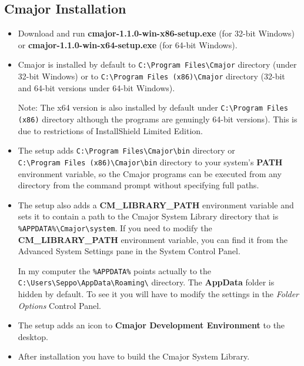 \documentclass[oneside, a4paper, 11pt]{article}
\begin{document}
\subsection{Cmajor Installation}

\begin{itemize}

\item
Download and run \textbf{cmajor-1.1.0-win-x86-setup.exe} (for 32-bit Windows) or
\textbf{cmajor-1.1.0-win-x64-setup.exe} (for 64-bit Windows).

\item
Cmajor is installed by default to \verb|C:\Program Files\Cmajor| directory (under 32-bit Windows) or
to \verb|C:\Program Files (x86)\Cmajor| directory (32-bit and 64-bit versions under 64-bit Windows).

Note: The x64 version is also installed by default under
\verb|C:\Program Files (x86)| directory although the programs are genuingly 64-bit versions).
This is due to restrictions of InstallShield Limited Edition.

\item
The setup adds \verb|C:\Program Files\Cmajor\bin| directory or \\
\verb|C:\Program Files (x86)\Cmajor\bin| directory
to your system's \textbf{PATH} environment variable, so the Cmajor programs can be executed from any
directory from the command prompt without specifying full paths.

\item
The setup also adds a \textbf{CM\_LIBRARY\_PATH} environment variable and
sets it to contain a path to the Cmajor System Library directory
that is \verb|%APPDATA%\Cmajor\system|. If you need to modify the
\textbf{CM\_LIBRARY\_PATH} environment variable, you can find it from the Advanced System Settings pane in the System Control Panel.

In my computer the \verb|%APPDATA%| points actually to the
\verb|C:\Users\Seppo\AppData\Roaming\| directory. The \textbf{AppData} folder
is hidden by default. To see it you will have to modify the settings in
the \emph{Folder Options} Control Panel.

\item
The setup adds an icon to \textbf{Cmajor Development Environment} to the desktop.

\item
After installation you have to build the Cmajor System Library.

\end{itemize}
\end{document}
